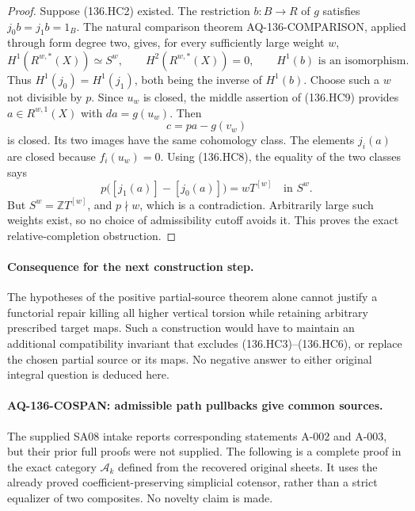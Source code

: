 \begin{proof}
Suppose (136.HC2) existed. The restriction $b:B\to R$ of
$g$ satisfies $j_0b=j_1b=1_B$. The natural comparison theorem
AQ-136-COMPARISON, applied through form degree two, gives,
for every sufficiently large weight $w$,
\[
 H^1(R^{w,*}(X))\simeq S^w,\qquad
 H^2(R^{w,*}(X))=0,\qquad
 H^1(b)\text{ is an isomorphism}.                         \tag{136.HC9}
\]
Thus $H^1(j_0)=H^1(j_1)$, both being the inverse of $H^1(b)$.
Choose such a $w$ not divisible by $p$. Since $u_w$ is
closed, the middle assertion of (136.HC9) provides
$a\in R^{w,1}(X)$ with $da=g(u_w)$. Then
\[
                           c=pa-g(v_w)
\]
is closed. Its two images have the same cohomology class.
The elements $j_i(a)$ are closed because $f_i(u_w)=0$.
Using (136.HC8), the equality of the two classes says
\[
        p\bigl([j_1(a)]-[j_0(a)]\bigr)=wT^{[w]}
                                      \quad\text{in }S^w.
                                                               \tag{136.HC10}
\]
But $S^w=\mathbb ZT^{[w]}$, and $p\nmid w$, which is a
contradiction. Arbitrarily large such weights exist, so
no choice of admissibility cutoff avoids it.
This proves the exact relative-completion obstruction.
\end{proof}

\paragraph{Consequence for the next construction step.}
The hypotheses of the positive partial-source theorem alone
cannot justify a functorial repair killing all higher
vertical torsion while retaining arbitrary prescribed target
maps. Such a construction would have to maintain an additional
compatibility invariant that excludes (136.HC3)--(136.HC6),
or replace the chosen partial source or its maps. No negative
answer to either original integral question is deduced here.


\paragraph{AQ-136-COSPAN: admissible path pullbacks give common sources.}
The supplied SA08 intake reports corresponding statements
A-002 and A-003, but their prior full proofs were not supplied.
The following is a complete proof in the exact category
$\mathcal A_k$ defined from the recovered original sheets.
It uses the already proved coefficient-preserving simplicial
cotensor, rather than a strict equalizer of two composites.
No novelty claim is made.

